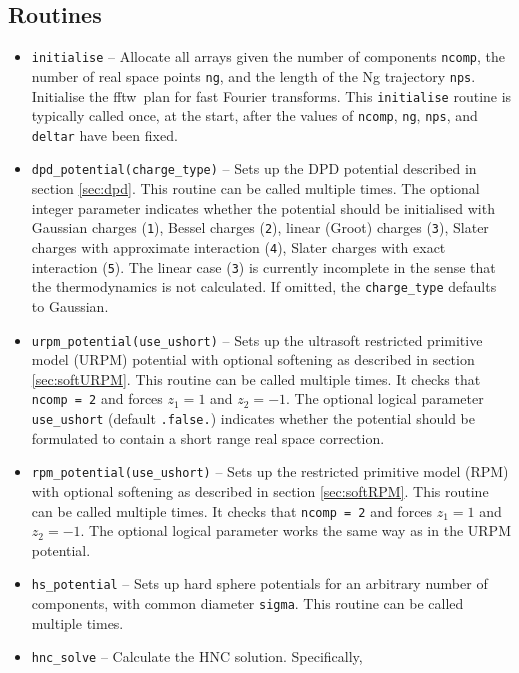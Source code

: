 \documentclass[12pt,a4paper]{article}
\newcommand{\FFTW}{{\sc fftw}}
\begin{document}
\subsection{Routines}
%
\begin{itemize}
%
\item\verb+initialise+ -- Allocate all arrays given the number of
  components \verb+ncomp+, the number of real space points \verb+ng+,
  and the length of the Ng trajectory \verb+nps+.  Initialise the
  \FFTW\ plan for fast Fourier transforms.  This \verb+initialise+
  routine is typically called once, at the start, after the values of
  \verb+ncomp+, \verb+ng+, \verb+nps+, and \verb+deltar+ have been
  fixed.
%
\item\verb+dpd_potential(charge_type)+ -- Sets up the DPD potential
  described in section \ref{sec:dpd}.  This routine can be called
  multiple times.  The optional integer parameter indicates whether
  the potential should be initialised with Gaussian charges
  (\verb+1+), Bessel charges (\verb+2+), linear (Groot) charges
  (\verb+3+), Slater charges with approximate interaction (\verb+4+),
  Slater charges with exact interaction (\verb+5+).  The linear case
  (\verb+3+) is currently incomplete in the sense that the
  thermodynamics is not calculated.  If omitted, the
  \verb+charge_type+ defaults to Gaussian.
%
\item\verb+urpm_potential(use_ushort)+ -- Sets up the ultrasoft
  restricted primitive model (URPM) potential with optional softening
  as described in section \ref{sec:softURPM}.  This routine can be
  called multiple times.  It checks that \verb+ncomp = 2+ and forces
  $z_1=1$ and $z_2=-1$.  The optional logical parameter
  \verb+use_ushort+ (default \verb+.false.+) indicates whether the
  potential should be formulated to contain a short range real space
  correction.
%
\item\verb+rpm_potential(use_ushort)+ -- Sets up the restricted
  primitive model (RPM) with optional softening as described in
  section \ref{sec:softRPM}.  This routine can be called multiple
  times.  It checks that \verb+ncomp = 2+ and forces $z_1=1$ and
  $z_2=-1$.  The optional logical parameter works the same way as in
  the URPM potential.
%
\item\verb+hs_potential+ -- Sets up hard sphere potentials for an
  arbitrary number of components, with common diameter \verb+sigma+.
  This routine can be called multiple times.
%
\item\verb+hnc_solve+ -- Calculate the HNC solution.  Specifically,

\end{itemize}
\end{document}
